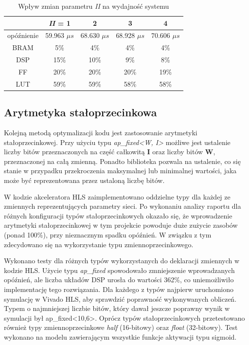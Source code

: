 \begin{table}[h] \centering
  \caption{Wpływ zmian parametru \emph{II} na wydajność systemu}
  \centering
  \begin{tabular} {c|c|c|c|c} \hline \label{tab:ii-relu}  

                  & \emph{II} = 1               & 2               & 3               & 4        \\\hline
    opóźnienie    & 59.963  $\mu s$ & 68.630 $\mu s$  & 68.928 $\mu s$  & 70.606 $\mu s$  \\
    BRAM          & 5\%             & 4\%             & 4\%             & 4\%             \\
    DSP           & 15\%            & 10\%            & 9\%             & 8\%             \\
    FF            & 20\%            & 20\%            & 20\%            & 19\%            \\
    LUT           & 59\%            & 59\%            & 58\%            & 58\%            \\
  \end{tabular}
\end{table}



\subsection{Arytmetyka stałoprzecinkowa}

Kolejną metodą optymalizacji kodu jest zastosowanie arytmetyki stałoprzecinkowej. Przy użyciu typu \emph{ap\_fixed<W, I>} możliwe jest ustalenie liczby bitów przeznaczonych na część całkowitą \textbf{I} oraz liczby bitów \textbf{W}, przeznaczonej na całą zmienną. Ponadto biblioteka pozwala na ustalenie, co się stanie w przypadku przekroczenia maksymalnej lub minimalnej wartości, jaka może być reprezentowana przez ustaloną liczbę bitów.

W kodzie akceleratora HLS zaimplementowano oddzielne typy dla każdej ze zmiennych reprezentujących parametry sieci. Po wykonaniu analizy raportu dla różnych konfiguracji typów stałoprzecinkowych okazało się, że wprowadzenie arytmetyki stałoprzecinkowej w tym projekcie powoduje duże zużycie zasobów (ponad 100\%), przy nieznacznym spadku opóźnień. W związku z tym zdecydowano się na wykorzystanie typu zmiennoprzecinkowego.

Wykonano testy dla różnych typów wykorzystanych do deklaracji zmiennych w kodzie HLS. Użycie typu \emph{ap\_fixed} spowodowało zmniejszenie wprowadzanych opóźnień, ale liczba układów DSP urosła do wartości 362\%, co uniemożliwiło implementację tego rozwiązania. Dla każdego z typów najpierw uruchomiono symulację w Vivado HLS, aby sprawdzić poprawność wykonywanych obliczeń.
Typem o najmniejszej liczbie bitów, który dawał jeszcze poprawny wynik w symulacji był ap\_fixed<10,6>. Oprócz typów stałoprzecinkowych przetestowano również typy zmiennoprzecinkowe \emph{half} (16-bitowy) oraz \emph{float} (32-bitowy). Test wykonano na modelu zawierającym wszystkie funkcje aktywacji typu sigmoid.


